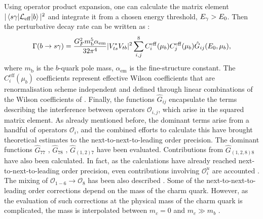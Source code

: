 Using operator product expansion, one can calculate the matrix element $|\mel*{s\gamma}{\mathcal{L}_{\mathrm{eff}}}{b}|^2$ and integrate it from a chosen energy threshold, ${E_{\gamma}}>E_0$. 
Then the perturbative decay rate can be written as \cite{Misiak:2020vlo}:
\begin{equation}\label{eq:theory_decay_rate}
    \Gamma(b\rightarrow s\gamma) = \frac{G^2_F m_{\mathrm{b}}^5 \alpha_{\mathrm{em}}}{32\pi^4}|V_{ts}^*V_{tb}|^2\sum_{i,j}^8C^{\mathrm{eff}}_{i}(\mu_b)C^{\mathrm{eff}}_{j}(\mu_b)\hat{G}_{ij}(E_0,\mu_b),
\end{equation}
where $m_{\mathrm{b}}$ is the $b$-quark pole mass, $\alpha_{\mathrm{em}}$ is the fine-structure constant.
The $C_{i}^{\mathrm{eff}}(\mu_b)$ coefficients represent effective Wilson coefficients \cite{Buras:1993xp} that are renormalisation scheme independent and defined through linear combinations of the Wilson coefficients of .
Finally, the functions $\hat{G}_{ij}$ encapsulate the terms describing the interference between operators $\mathcal{O}_{i,j}$, which arise in the squared matrix element.
As already mentioned before, the dominant terms arise from a handful of operators $\mathcal{O}_i$, and the combined efforts to calculate this have brought \BtoXsgamma theoretical estimates to the next-to-next-to-leading order precision.
The dominant functions $\hat{G}_{77}$ \cite{Asatrian:2006rq}, $\hat{G}_{78}$ \cite{Asatrian:2010rq}, $\hat{G}_{(1,2)7}$ \cite{Boughezal:2007ny,Misiak:2020vlo} have been evaluated.
Contributions from $\hat{G}_{(1,2,8)8}$ \cite{Ferroglia:2010xe,Misiak:2010tk} have also been calculated.
In fact, as the calculations have already reached next-to-next-to-leading order precision, even contributions involving $\mathcal{O}_{i}^u$ are accounted \cite{Huber:2014nna}.
The mixing of $\mathcal{O}_{1-6}\to\mathcal{O}_8$ has been also described \cite{Czakon:2006ss}. 
Some of the next-to-next-to-leading order corrections depend on the mass of the charm quark.
However, as the evaluation of such corrections at the physical mass of the charm quark is complicated, the mass is interpolated between $m_c=0$ and $m_c\gg m_b$ \cite{Misiak:2019ccp}.


